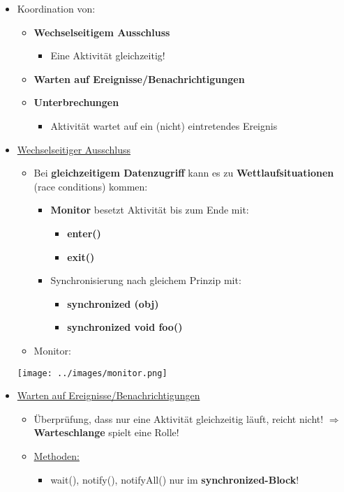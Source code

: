 			\begin{itemize}
				\item Koordination von:
				\begin{itemize}
					\item \textbf{Wechselseitigem Ausschluss}
					\begin{itemize}
						\item Eine Aktivität gleichzeitig!
					\end{itemize}
					\item \textbf{Warten auf Ereignisse/Benachrichtigungen}
					\item \textbf{Unterbrechungen}
					\begin{itemize}
						\item Aktivität wartet auf ein (nicht) eintretendes Ereignis
					\end{itemize}
				\end{itemize}
				\newpage
				\item \underline{Wechselseitiger Ausschluss}
				\begin{itemize}
					\item Bei \textbf{gleichzeitigem Datenzugriff} kann es zu \textbf{Wettlaufsituationen} (race conditions) kommen:
					\begin{itemize}
						\item \textbf{Monitor} besetzt Aktivität bis zum Ende mit:
						\begin{itemize}
							\item \textbf{enter()}
							\item \textbf{exit()}
						\end{itemize}
						\item Synchronisierung nach gleichem Prinzip mit:
						\begin{itemize}
							\item \textbf{synchronized (obj)}
							\item \textbf{synchronized void foo()}
						\end{itemize}
					\end{itemize}
					\item Monitor:
				\end{itemize}		
				\begin{center}
					\texttt{[image: ../images/monitor.png]}
				\end{center}				
				\item \underline{Warten auf Ereignisse/Benachrichtigungen}
				\begin{itemize}
					\item Überprüfung, dass nur eine Aktivität gleichzeitig läuft, reicht nicht!
					$\Rightarrow$ \textbf{Warteschlange} spielt eine Rolle!
					\newpage
					\item \underline{Methoden:}
					\begin{itemize}
						\item wait(), notify(), notifyAll() nur im \textbf{synchronized-Block}!
						

\end{itemize}
\end{itemize}
\end{itemize}
